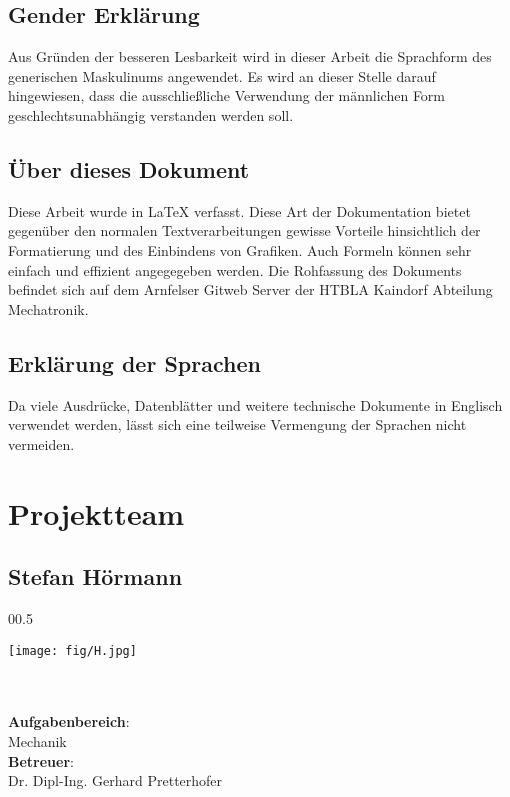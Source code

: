 \newpage
\thispagestyle{empty}
\mbox{}

\clearpage

\subsection*{Gender Erklärung}
\label{sec:gender-erklaerung}
Aus Gründen der besseren Lesbarkeit wird in dieser Arbeit die Sprachform des generischen Maskulinums angewendet.
Es wird an dieser Stelle darauf hingewiesen, dass die ausschließliche Verwendung der männlichen Form geschlechtsunabhängig verstanden werden soll.

\subsection*{Über dieses Dokument}
\label{sec:ueber-dokument}
Diese Arbeit wurde in \LaTeX{} verfasst.
Diese Art der Dokumentation bietet gegenüber den normalen Textverarbeitungen gewisse Vorteile hinsichtlich der Formatierung und des Einbindens von Grafiken.
Auch Formeln können sehr einfach und effizient angegegeben werden. Die Rohfassung des Dokuments befindet sich auf dem Arnfelser Gitweb Server der HTBLA Kaindorf Abteilung Mechatronik.

\subsection*{Erklärung der Sprachen}
\label{sec:erklärung-sprachen}
Da viele Ausdrücke, Datenblätter und weitere technische Dokumente in Englisch verwendet werden, lässt sich eine teilweise Vermengung der Sprachen nicht vermeiden.
\clearpage

\newpage
\thispagestyle{empty}
\mbox{}

\clearpage

\section*{Projektteam}
\label{sec:projektteam}

\subsection*{Stefan Hörmann}
\begin{wrapfigure}[10]{0}{0.5\textwidth}
\begin{center}
  \vspace{-20mm}
  \texttt{[image: fig/H.jpg]}
\end{center}
\end{wrapfigure}
\mbox{}\\
\mbox{}\\
\textbf{Aufgabenbereich}:\\
Mechanik\\
\textbf{Betreuer}:\\
Dr. Dipl-Ing. Gerhard Pretterhofer
\mbox{}\\
\mbox{}\\
\mbox{}\\
